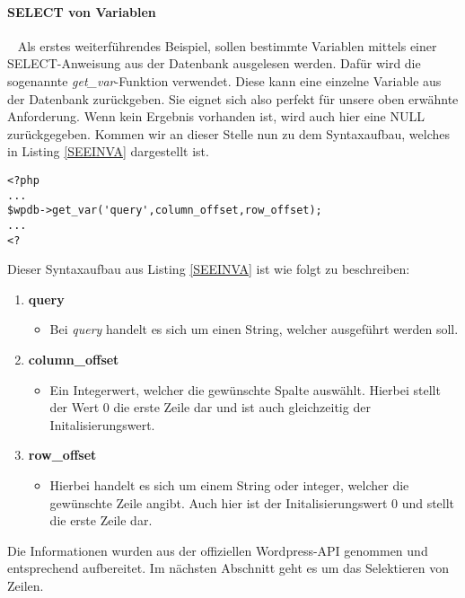 \paragraph{SELECT von Variablen}\ \newline
Als erstes weiterführendes Beispiel, sollen bestimmte Variablen mittels einer SELECT-Anweisung aus der Datenbank ausgelesen werden.\newline
Dafür wird die sogenannte \emph{get\_var}-Funktion verwendet. Diese kann eine einzelne Variable aus der Datenbank zurückgeben. Sie eignet sich also perfekt für unsere oben erwähnte Anforderung. Wenn kein Ergebnis vorhanden ist, wird auch hier eine NULL zurückgegeben.\newline
Kommen wir an dieser Stelle nun zu dem Syntaxaufbau, welches in Listing \ref{SEEINVA} dargestellt ist. 
\begin{lstlisting}
<?php
...
$wpdb->get_var('query',column_offset,row_offset);
...
<?
\end{lstlisting}
Dieser Syntaxaufbau aus Listing \ref{SEEINVA} ist wie folgt zu beschreiben:
\begin{enumerate}
	\item {\bf query} 
	\begin{itemize}
		\item Bei \emph{query} handelt es sich um einen String, welcher ausgeführt werden soll. 
	\end{itemize}
	\item {\bf column\_offset}
	\begin{itemize}
		\item Ein Integerwert, welcher die gewünschte Spalte auswählt. Hierbei stellt der Wert 0 die erste Zeile dar und ist auch gleichzeitig der Initalisierungswert.
	\end{itemize}
	\item {\bf row\_offset}
	\begin{itemize}
		\item Hierbei handelt es sich um einem String oder integer, welcher die gewünschte Zeile angibt. Auch hier ist der Initalisierungswert 0 und stellt die erste Zeile dar. 
	\end{itemize}
\end{enumerate}
Die Informationen wurden aus der offiziellen Wordpress-API genommen und entsprechend aufbereitet. Im nächsten Abschnitt geht es um das Selektieren von Zeilen.
